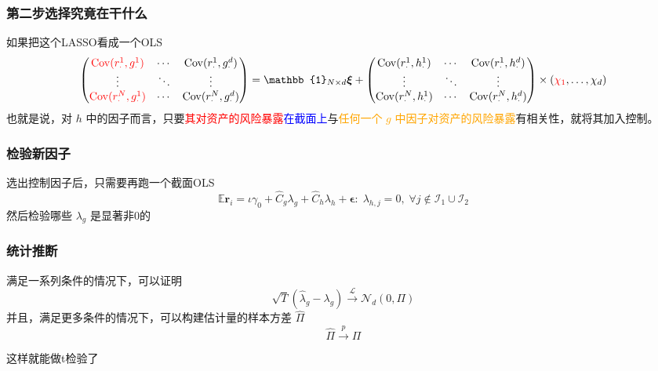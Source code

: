 \documentclass[
  UTF8,
  xcolor={dvipsnames,rgb},
  hyperref={colorlinks, citecolor=orange, linkcolor=black},
  aspectratio=169
  ]{beamer}
\begin{document}
\begin{frame}
    \frametitle{第二步选择究竟在干什么}
    如果把这个LASSO看成一个OLS
    {\small
        \[
        \begin{pmatrix}
            \textcolor{red}{\mathrm{Cov}(r_{\cdot}^{1},g_{\cdot}^{1})} & \cdots & \mathrm{Cov}(r_{\cdot}^{1},g_{\cdot}^{d}) \\
            \vdots & \ddots & \vdots \\
            \textcolor{red}{\mathrm{Cov}(r_{\cdot}^{N},g_{\cdot}^{1})} & \cdots & \mathrm{Cov}(r_{\cdot}^{N},g_{\cdot}^{d})
            \end{pmatrix}=\mathbb{1}_{N\times d} \boldsymbol{\xi} + \begin{pmatrix}
            \mathrm{Cov}(r_{\cdot}^{1},h_{\cdot}^{1}) & \cdots & \mathrm{Cov}(r_{\cdot}^{1},h_{\cdot}^{d}) \\
            \vdots & \ddots & \vdots \\
            \mathrm{Cov}(r_{\cdot}^{N},h_{\cdot}^{1}) & \cdots & \mathrm{Cov}(r_{\cdot}^{N},h_{\cdot}^{d})
            \end{pmatrix}\times (\textcolor{red}{\chi_{1}},\dots,\chi_{d})
        \]
    }
    也就是说，对 \(h\) 中的因子而言，只要\textcolor{red}{其对资产的风险暴露}\textcolor{blue}{在截面上}与\textcolor{orange}{任何一个 \(g\) 中因子对资产的风险暴露}有相关性，就将其加入控制。
\end{frame}

\begin{frame}
    \frametitle{检验新因子}

    选出控制因子后，只需要再跑一个截面OLS
    \[
        \mathbb{E}\boldsymbol{r}_{i}=\iota \gamma_{0}+\hat{C}_{g}\lambda_{g}+\hat{C}_{h}\lambda_{h}+\boldsymbol{\epsilon}: \; \lambda_{h,j}=0, \; \forall j \notin \mathcal{I}_1 \cup \mathcal{I}_2
    \]
    然后检验哪些 \(\lambda_g\) 是显著非0的

\end{frame}

\begin{frame}
    \frametitle{统计推断}

    \begin{theorem}
        满足一系列条件的情况下，可以证明
        \[\sqrt{T}(\hat{\lambda}_g-\lambda_g) \xrightarrow{\mathcal{L}} \mathcal{N}_d (0,\Pi)\]
        并且，满足更多条件的情况下，可以构建估计量的样本方差 \(\hat{\Pi}\)
        \[\hat{\Pi} \xrightarrow{p} \Pi\]
    \end{theorem}
    这样就能做t检验了
\end{frame}
\end{document}
